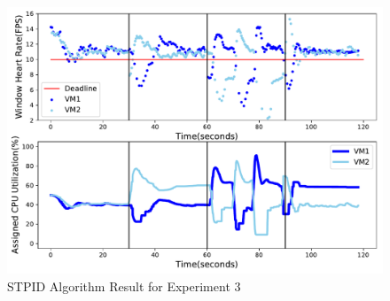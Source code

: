 \begin{figure}[h!]
\centering
\includegraphics[width=1\linewidth]{images/2vm_apid}
\caption{STPID Algorithm Result for Experiment 3}
\label{2vm_apid}
\end{figure}


